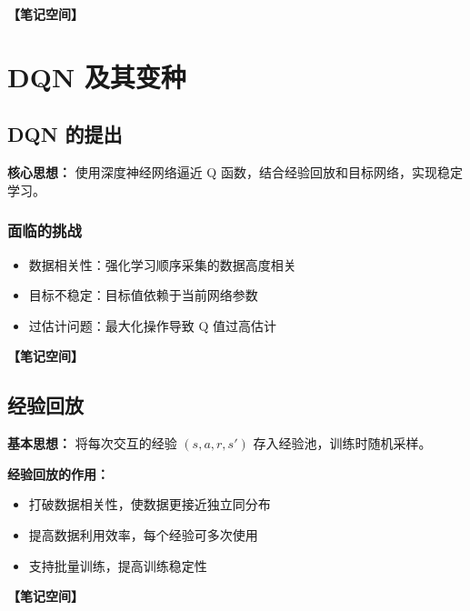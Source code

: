 \documentclass[12pt,a4paper]{article}
\newcommand{\notespace}[1][3cm]{%
  \vspace{#1}%
  \noindent\textbf{【笔记空间】}%
  \vspace{#1}%
}
\newcommand{\1}{\mathbf{1}}
\begin{document}
\notespace[3cm]

\newpage

\section{DQN 及其变种}

\subsection{DQN 的提出}

\begin{keybox}
\textbf{核心思想：} 使用深度神经网络逼近 Q 函数，结合经验回放和目标网络，实现稳定学习。
\end{keybox}

\subsubsection*{面临的挑战}

\begin{itemize}[leftmargin=2em]
  \item 数据相关性：强化学习顺序采集的数据高度相关
  \item 目标不稳定：目标值依赖于当前网络参数
  \item 过估计问题：最大化操作导致 Q 值过高估计
\end{itemize}

\notespace[2cm]

\subsection{经验回放}

\textbf{基本思想：} 将每次交互的经验 $(s,a,r,s')$ 存入经验池，训练时随机采样。

\begin{keybox}
\textbf{经验回放的作用：}
\begin{itemize}[leftmargin=1.5em]
  \item 打破数据相关性，使数据更接近独立同分布
  \item 提高数据利用效率，每个经验可多次使用
  \item 支持批量训练，提高训练稳定性
\end{itemize}
\end{keybox}

\notespace[2cm]
\end{document}
